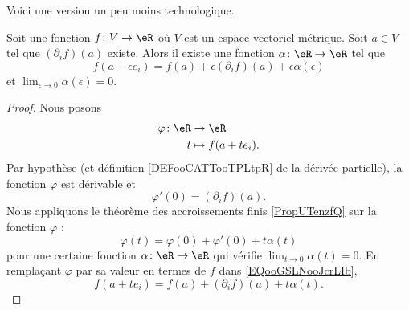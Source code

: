 Voici une version un peu moins technologique.
\begin{proposition}     \label{PROPooYYSMooUDxtlB}
    Soit une fonction \( f\colon V\to \eR\) où \( V\) est un espace vectoriel métrique. Soit \( a\in V\) tel que \( (\partial_if)(a)\) existe. Alors il existe une fonction \( \alpha\colon \eR\to \eR\) tel que
    \begin{equation}
        f(a+\epsilon e_i)=f(a)+\epsilon(\partial_if)(a)+\epsilon\alpha(\epsilon)
    \end{equation}
    et \( \lim_{\epsilon\to 0}\alpha(\epsilon)=0\).
\end{proposition}

\begin{proof}
    Nous posons
    \begin{equation}
        \begin{aligned}
            \varphi\colon \eR&\to \eR \\
            t&\mapsto f(a+ te_i). 
        \end{aligned}
    \end{equation}
    Par hypothèse (et définition \ref{DEFooCATTooTPLtpR} de la dérivée partielle), la fonction \( \varphi\) est dérivable et 
    \begin{equation}
        \varphi'(0)=(\partial_if)(a).
    \end{equation}
    Nous appliquons le théorème des accroissements finis \ref{PropUTenzfQ} sur la fonction \( \varphi\) :
    \begin{equation}        \label{EQooGSLNooJcrLIb}
        \varphi(t)=\varphi(0)+\varphi'(0)+t\alpha(t)
    \end{equation}
    pour une certaine fonction \( \alpha\colon \eR\to \eR\) qui vérifie \( \lim_{t\to 0} \alpha(t)=0\). En remplaçant \( \varphi\) par sa valeur en termes de \( f\) dans \eqref{EQooGSLNooJcrLIb},
    \begin{equation}
        f(a+te_i)=f(a)+(\partial_if)(a)+t\alpha(t).
    \end{equation}
\end{proof}
